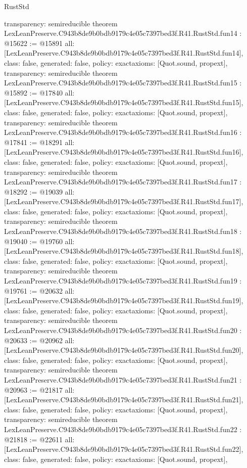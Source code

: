 \begin{lexlean}{RustStd}
\begin{coremodule}
{  transparency: semireducible
}
theorem LexLeanPreserve.C943b8de9b0bdb9179c4e05c7397bed3f.R41.RustStd.fun14 : @15622 := @15891 {
  all: [LexLeanPreserve.C943b8de9b0bdb9179c4e05c7397bed3f.R41.RustStd.fun14],
  class: false,
  generated: false,
  policy: exact{axioms: [Quot.sound, propext]},
  transparency: semireducible
}
theorem LexLeanPreserve.C943b8de9b0bdb9179c4e05c7397bed3f.R41.RustStd.fun15 : @15892 := @17840 {
  all: [LexLeanPreserve.C943b8de9b0bdb9179c4e05c7397bed3f.R41.RustStd.fun15],
  class: false,
  generated: false,
  policy: exact{axioms: [Quot.sound, propext]},
  transparency: semireducible
}
theorem LexLeanPreserve.C943b8de9b0bdb9179c4e05c7397bed3f.R41.RustStd.fun16 : @17841 := @18291 {
  all: [LexLeanPreserve.C943b8de9b0bdb9179c4e05c7397bed3f.R41.RustStd.fun16],
  class: false,
  generated: false,
  policy: exact{axioms: [Quot.sound, propext]},
  transparency: semireducible
}
theorem LexLeanPreserve.C943b8de9b0bdb9179c4e05c7397bed3f.R41.RustStd.fun17 : @18292 := @19039 {
  all: [LexLeanPreserve.C943b8de9b0bdb9179c4e05c7397bed3f.R41.RustStd.fun17],
  class: false,
  generated: false,
  policy: exact{axioms: [Quot.sound, propext]},
  transparency: semireducible
}
theorem LexLeanPreserve.C943b8de9b0bdb9179c4e05c7397bed3f.R41.RustStd.fun18 : @19040 := @19760 {
  all: [LexLeanPreserve.C943b8de9b0bdb9179c4e05c7397bed3f.R41.RustStd.fun18],
  class: false,
  generated: false,
  policy: exact{axioms: [Quot.sound, propext]},
  transparency: semireducible
}
theorem LexLeanPreserve.C943b8de9b0bdb9179c4e05c7397bed3f.R41.RustStd.fun19 : @19761 := @20632 {
  all: [LexLeanPreserve.C943b8de9b0bdb9179c4e05c7397bed3f.R41.RustStd.fun19],
  class: false,
  generated: false,
  policy: exact{axioms: [Quot.sound, propext]},
  transparency: semireducible
}
theorem LexLeanPreserve.C943b8de9b0bdb9179c4e05c7397bed3f.R41.RustStd.fun20 : @20633 := @20962 {
  all: [LexLeanPreserve.C943b8de9b0bdb9179c4e05c7397bed3f.R41.RustStd.fun20],
  class: false,
  generated: false,
  policy: exact{axioms: [Quot.sound, propext]},
  transparency: semireducible
}
theorem LexLeanPreserve.C943b8de9b0bdb9179c4e05c7397bed3f.R41.RustStd.fun21 : @20963 := @21817 {
  all: [LexLeanPreserve.C943b8de9b0bdb9179c4e05c7397bed3f.R41.RustStd.fun21],
  class: false,
  generated: false,
  policy: exact{axioms: [Quot.sound, propext]},
  transparency: semireducible
}
theorem LexLeanPreserve.C943b8de9b0bdb9179c4e05c7397bed3f.R41.RustStd.fun22 : @21818 := @22611 {
  all: [LexLeanPreserve.C943b8de9b0bdb9179c4e05c7397bed3f.R41.RustStd.fun22],
  class: false,
  generated: false,
  policy: exact{axioms: [Quot.sound, propext]},
}
\end{coremodule}
\end{lexlean}

